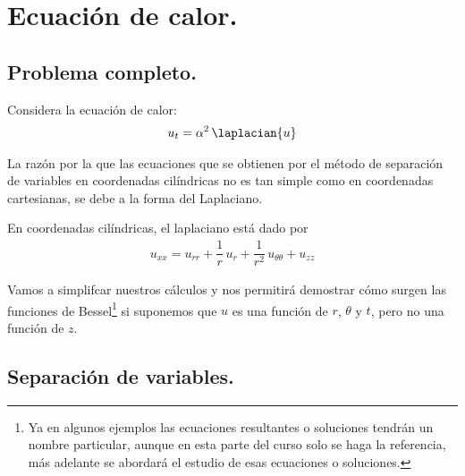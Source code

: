 \section{Ecuación de calor.}
\subsection{Problema completo.}

Considera la ecuación de calor:
\begin{align*}
u_{t} =  \alpha^{2} \,  \laplacian{u}
\end{align*}

La razón por la que las ecuaciones que se obtienen por el método de separación de variables en coordenadas cilíndricas no es tan simple como en coordenadas cartesianas, se debe a la forma del Laplaciano. 

En coordenadas cilíndricas, el laplaciano está dado por
\begin{align*}
u_{xx} = u_{rr} + \dfrac{1}{r} \, u_{r} + \dfrac{1}{r^{2}} \, u_{\theta \theta} + u_{zz}
\end{align*}

Vamos a simplifcar nuestros cálculos y nos permitirá demostrar cómo surgen las funciones de Bessel\footnote{Ya en algunos ejemplos las ecuaciones resultantes o soluciones tendrán un nombre particular, aunque en esta parte del curso solo se haga la referencia, más adelante se abordará el estudio de esas ecuaciones o soluciones.} si suponemos que $u$ es una función de $r$, $\theta$ y $t$, pero no una función de $z$.

\subsection{Separación de variables.}

